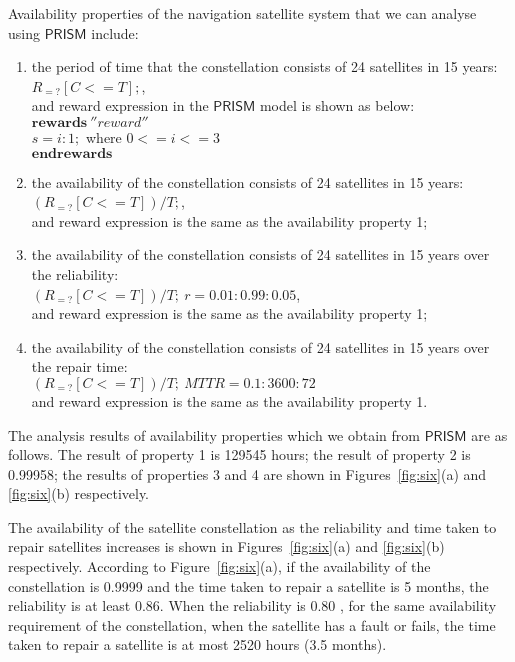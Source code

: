 \documentclass[preprint,12pt]{qrei}
\begin{document}
Availability properties of the navigation satellite system that we can analyse using $\mathsf{PRISM}$ include:

\begin{enumerate}
\item the period of time that the constellation consists of 24 satellites in 15 years:\\
$R_{=?}[C<=T];$,\\
and reward expression in the $\mathsf{PRISM}$ model is shown as below:\\
$\textbf{rewards}\ ''reward''$\\
$s=i:1;$ where $0<=i<=3$\\
$\textbf{endrewards}$
\item the availability of the constellation consists of 24 satellites in 15 years:\\
$(R_{=?}[C<=T])/T;$,\\
and reward expression is the same as the availability property 1;
\item the availability of the constellation consists of 24 satellites in 15 years over the reliability:\\
$(R_{=?}[C<=T])/T;\ r=0.01:0.99:0.05$,\\
and reward expression is the same as the availability property 1;
\item the availability of the constellation consists of 24 satellites in 15 years over the repair time:\\
$(R_{=?}[C<=T])/T;\ MTTR=0.1:3600:72$\\
and reward expression is the same as the availability property 1.
\end{enumerate}

The analysis results of availability properties which we obtain from $\mathsf{PRISM}$ are as follows. The result of property 1 is 129545 hours; the result of property 2 is 0.99958; the results of properties 3 and 4 are shown in Figures~\ref{fig:six}(a) and \ref{fig:six}(b) respectively.

The availability of the satellite constellation as the reliability and time taken to repair satellites increases is shown in Figures~\ref{fig:six}(a) and \ref{fig:six}(b) respectively. According to Figure~\ref{fig:six}(a), if the availability of the constellation is 0.9999 and the time taken to repair a satellite is 5 months, the reliability is at least 0.86. When the reliability is 0.80 , for the same availability requirement of the constellation, when the satellite has a fault or fails, the time taken to repair a satellite is at most 2520 hours (3.5 months).
\end{document}
